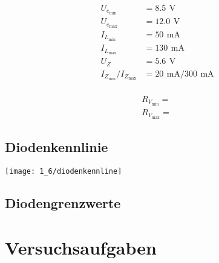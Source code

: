 \documentclass[a4paper, 12pt]{article}
\begin{document}
\begin{align*}
  U_{e_{\textrm{min}}} &= 8.5 \,\ \si{\volt}\\
  U_{e_{\textrm{max}}} &= 12.0 \,\ \si{\volt}\\
  I_{L_{\textrm{min}}} &= 50 \,\ \si{\milli\ampere}\\
  I_{L_{\textrm{max}}} &= 130 \,\ \si{\milli\ampere}\\
  U_{Z} &= 5.6 \,\ \si{\volt}\\
  I_{Z_{\textrm{min}}}/I_{Z_{\textrm{max}}} &= 20 \,\ \si{\milli\ampere} / 300 \,\ \si{\milli\ampere}\\
\end{align*}

\begin{gather*}
  R_{V_{\textrm{min}}} = \frac{}{}\\
  R_{V_{\textrm{max}}} = \frac{}{}
\end{gather*}

\subsection{Diodenkennlinie}

\begin{center}
  \texttt{[image: 1\_6/diodenkennline]}
\end{center}


\subsection{Diodengrenzwerte}


\section{Versuchsaufgaben}

\end{document}
